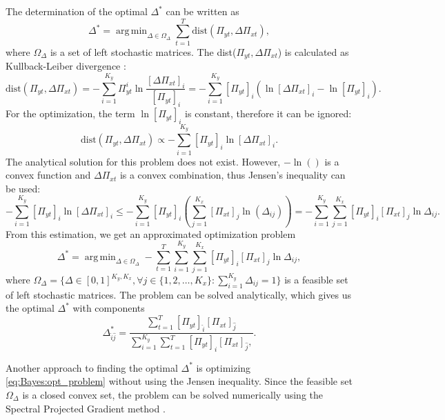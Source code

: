 \documentclass{aip-cp}
\DeclareMathOperator*{\argmin}{arg\,min}
\begin{document}
The determination of the optimal $\Delta^{*}$ can be written as
\begin{equation}
    \Delta^* = \argmin_{\Delta \in \Omega_{\Delta}} \sum_{t=1}^T \text{dist}(\Pi_{yt}, \Delta\Pi_{xt}),
    \label{eq:Bayes:opt_problem}
\end{equation}
where $\Omega_{\Delta}$ is a set of left stochastic matrices. The dist($\Pi_{yt}, \Delta\Pi_{xt}$) is calculated as Kullback-Leiber divergence \cite{Kullback1951}:
\begin{equation}
    \text{dist}(\Pi_{yt}, \Delta\Pi_{xt}) = - \sum_{i=1}^{K_y} \Pi_{yt}^i \ln\frac{[\Delta\Pi_{xt}]_i}{[\Pi_{yt}]_i} = - \sum_{i=1}^{K_y} [\Pi_{yt}]_i (\ln [\Delta\Pi_{xt}]_i - \ln [\Pi_{yt}]_i).
\end{equation}
For the optimization, the term $\ln [\Pi_{yt}]_i$ is constant, therefore it can be ignored:
\begin{equation}
    \text{dist}(\Pi_{yt}, \Delta\Pi_{xt}) \propto - \sum_{i=1}^{K_y} [\Pi_{yt}]_i \ln [\Delta\Pi_{xt}]_i.
\end{equation}
The analytical solution for this problem does not exist. However, $-\ln()$ is a convex function and $\Delta\Pi_{xt}$ is a convex combination, thus Jensen's inequality can be used:
\begin{equation}
    - \sum_{i=1}^{K_y} [\Pi_{yt}]_i \ln [\Delta\Pi_{xt}]_i \leq - \sum_{i=1}^{K_y} [\Pi_{yt}]_i ( \sum_{j=1}^{K_x} [\Pi_{xt}]_j \ln (\Delta_{ij}) ) = - \sum_{i=1}^{K_y} \sum_{j=1}^{K_x} [\Pi_{yt}]_i [\Pi_{xt}]_j \ln \Delta_{ij}.
\end{equation}
From this estimation, we get an approximated optimization problem
\begin{equation}
    \Delta^* = \argmin_{\Delta \in \Omega_{\Delta}} - \sum_{t=1}^T \sum_{i=1}^{K_y} \sum_{j=1}^{K_x} [\Pi_{yt}]_i [\Pi_{xt}]_j \ln \Delta_{ij},
\end{equation}
where $\Omega_{\Delta} = \{ \Delta \in [0, 1]^{K_y,K_x}, \forall j \in \{ 1, 2, \dots, K_x \} : \sum_{i=1}^{K_y} \Delta_{ij} = 1 \}$
is a feasible set of left stochastic matrices. The problem can be solved analytically, which gives us the optimal $\Delta^*$ with components
\begin{equation}
    \Delta_{\hat{i}\hat{j}}^{*} = \frac{\sum_{t=1}^{T} [\Pi_{yt}]_{\hat{i}} [\Pi_{xt}]_{\hat{j}}}{\sum_{i=1}^{K_y} \sum_{t=1}^{T} [\Pi_{yt}]_{i} [\Pi_{xt}]_{\hat{j}},}.
\end{equation}

Another approach to finding the optimal $\Delta^{*}$ is optimizing \eqref{eq:Bayes:opt_problem} without using the Jensen inequality. Since the feasible set $\Omega_{\Delta}$ is a closed convex set, the problem can be solved numerically using the Spectral Projected Gradient method \cite{birgin2000}.
\end{document}

